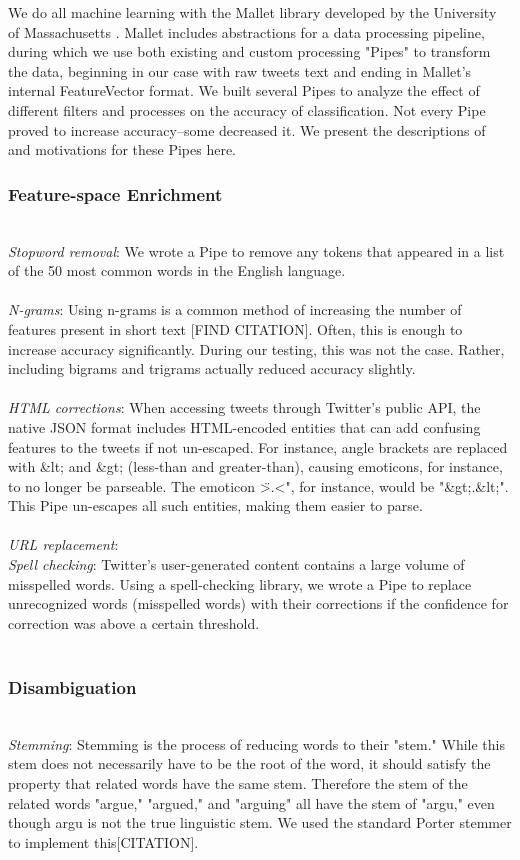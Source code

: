 \documentclass[letterpaper]{article}
\begin{document}
We do all machine learning with the Mallet library developed by the University of Massachusetts \cite{McCallumMALLET}. Mallet includes abstractions for a data processing pipeline, during which we use both existing and custom processing "Pipes" to transform the data, beginning in our case with raw tweets text and ending in Mallet's internal FeatureVector format. We built several Pipes to analyze the effect of different filters and processes on the accuracy of classification. Not every Pipe proved to increase accuracy--some decreased it. We present the descriptions of and motivations for these Pipes here.

\subsubsection{Feature-space Enrichment} ~\\
\textit{Stopword removal}: We wrote a Pipe to remove any tokens that appeared in a list of the 50 most common words in the English language.\\
~\\
\textit{N-grams}: Using n-grams is a common method of increasing the number of features present in short text [FIND CITATION]. Often, this is enough to increase accuracy significantly. During our testing, this was not the case. Rather, including bigrams and trigrams actually reduced accuracy slightly.\\
~\\
\textit{HTML corrections}: When accessing tweets through Twitter's public API, the native JSON format includes HTML-encoded entities that can add confusing features to the tweets if not un-escaped. For instance, angle brackets are replaced with \&lt; and \&gt; (less-than and greater-than), causing emoticons, for instance, to no longer be parseable. The emoticon \">.<", for instance, would be "\&gt;.\&lt;". This Pipe un-escapes all such entities, making them easier to parse.\\
~\\
\textit{URL replacement}: 
~\\
\textit{Spell checking}: Twitter's user-generated content contains a large volume of misspelled words. Using a spell-checking library, we wrote a Pipe to replace unrecognized words (misspelled words) with their corrections if the confidence for correction was above a certain threshold. \\
~\\
\subsubsection{Disambiguation}
~\\
\textit{Stemming}: Stemming is the process of reducing words to their "stem." While this stem does not necessarily have to be the root of the word, it should satisfy the property that related words have the same stem. Therefore the stem of the related words "argue," "argued," and "arguing" all have the stem of "argu," even though argu is not the true linguistic stem. We used the standard Porter stemmer to implement this[CITATION].\\
\end{document}
